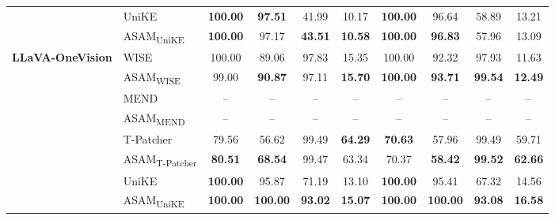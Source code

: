 \begin{table}[t]
\begin{tabular}{ll|cccc|cccc}
\cmidrule{2-10}
& UniKE & \textbf{100.00} & \textbf{97.51} & 41.99 & 10.17 & \textbf{100.00} & 96.64 & 58.89 & 13.21 \\
&\cellcolor[rgb]{0.949,0.949,0.949} ASAM\textsubscript{UniKE} &\cellcolor[rgb]{0.949,0.949,0.949} \textbf{100.00} &\cellcolor[rgb]{0.949,0.949,0.949} 97.17 &\cellcolor[rgb]{0.949,0.949,0.949} \textbf{43.51} &\cellcolor[rgb]{0.949,0.949,0.949} \textbf{10.58} &\cellcolor[rgb]{0.949,0.949,0.949} \textbf{100.00} &\cellcolor[rgb]{0.949,0.949,0.949} \textbf{96.83} &\cellcolor[rgb]{0.949,0.949,0.949} 57.96 &\cellcolor[rgb]{0.949,0.949,0.949} 13.09 \\
\midrule
\multirow{8}{1.7cm}{\centering\textbf{LLaVA-OneVision}} & WISE & 100.00 & 89.06 & 97.83 & 15.35 & 100.00 & 92.32 & 97.93 & 11.63 \\
&\cellcolor[rgb]{0.949,0.949,0.949} ASAM\textsubscript{WISE} &\cellcolor[rgb]{0.949,0.949,0.949} 99.00 &\cellcolor[rgb]{0.949,0.949,0.949} \textbf{90.87} &\cellcolor[rgb]{0.949,0.949,0.949} 97.11 &\cellcolor[rgb]{0.949,0.949,0.949} \textbf{15.70} &\cellcolor[rgb]{0.949,0.949,0.949} \textbf{100.00} &\cellcolor[rgb]{0.949,0.949,0.949} \textbf{93.71} &\cellcolor[rgb]{0.949,0.949,0.949} \textbf{99.54} &\cellcolor[rgb]{0.949,0.949,0.949} \textbf{12.49} \\
\cmidrule{2-10}
& MEND & -- & -- & -- & -- & -- & -- & -- & -- \\
&\cellcolor[rgb]{0.949,0.949,0.949} ASAM\textsubscript{MEND} &\cellcolor[rgb]{0.949,0.949,0.949} -- &\cellcolor[rgb]{0.949,0.949,0.949} -- &\cellcolor[rgb]{0.949,0.949,0.949} -- &\cellcolor[rgb]{0.949,0.949,0.949} -- &\cellcolor[rgb]{0.949,0.949,0.949} -- &\cellcolor[rgb]{0.949,0.949,0.949} -- &\cellcolor[rgb]{0.949,0.949,0.949} -- &\cellcolor[rgb]{0.949,0.949,0.949} -- \\
\cmidrule{2-10}
& T-Patcher & 79.56 & 56.62 & 99.49 & \textbf{64.29} & \textbf{70.63} & 57.96 & 99.49 & 59.71 \\
&\cellcolor[rgb]{0.949,0.949,0.949} ASAM\textsubscript{T-Patcher} &\cellcolor[rgb]{0.949,0.949,0.949} \textbf{80.51} &\cellcolor[rgb]{0.949,0.949,0.949} \textbf{68.54} &\cellcolor[rgb]{0.949,0.949,0.949} 99.47 &\cellcolor[rgb]{0.949,0.949,0.949} 63.34 &\cellcolor[rgb]{0.949,0.949,0.949} 70.37 &\cellcolor[rgb]{0.949,0.949,0.949} \textbf{58.42} &\cellcolor[rgb]{0.949,0.949,0.949} \textbf{99.52} &\cellcolor[rgb]{0.949,0.949,0.949} \textbf{62.66} \\
\cmidrule{2-10}
& UniKE & \textbf{100.00} & 95.87 & 71.19 & 13.10 & \textbf{100.00} & 95.41 & 67.32 & 14.56 \\
&\cellcolor[rgb]{0.949,0.949,0.949} ASAM\textsubscript{UniKE} &\cellcolor[rgb]{0.949,0.949,0.949} \textbf{100.00} &\cellcolor[rgb]{0.949,0.949,0.949} \textbf{100.00} &\cellcolor[rgb]{0.949,0.949,0.949} \textbf{93.02} &\cellcolor[rgb]{0.949,0.949,0.949} \textbf{15.07} &\cellcolor[rgb]{0.949,0.949,0.949} \textbf{100.00} &\cellcolor[rgb]{0.949,0.949,0.949} \textbf{100.00} &\cellcolor[rgb]{0.949,0.949,0.949} \textbf{93.08} &\cellcolor[rgb]{0.949,0.949,0.949} \textbf{16.58} \\
\bottomrule
\end{tabular}
\end{table}
